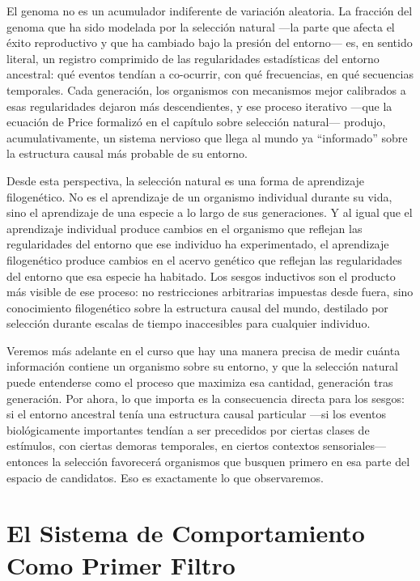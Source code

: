 \documentclass[
  letterpaper,
  DIV=11,
  numbers=noendperiod]{scrreprt}
\begin{document}
\begin{tcolorbox}[enhanced jigsaw, toprule=.15mm, arc=.35mm, colback=white, opacityback=0, colframe=quarto-callout-note-color-frame, breakable, rightrule=.15mm, left=2mm, leftrule=.75mm, bottomrule=.15mm]
El genoma no es un acumulador indiferente de variación aleatoria. La
fracción del genoma que ha sido modelada por la selección natural ---la
parte que afecta el éxito reproductivo y que ha cambiado bajo la presión
del entorno--- es, en sentido literal, un registro comprimido de las
regularidades estadísticas del entorno ancestral: qué eventos tendían a
co-ocurrir, con qué frecuencias, en qué secuencias temporales. Cada
generación, los organismos con mecanismos mejor calibrados a esas
regularidades dejaron más descendientes, y ese proceso iterativo ---que
la ecuación de Price formalizó en el capítulo sobre selección natural---
produjo, acumulativamente, un sistema nervioso que llega al mundo ya
``informado'' sobre la estructura causal más probable de su entorno.

Desde esta perspectiva, la selección natural es una forma de aprendizaje
filogenético. No es el aprendizaje de un organismo individual durante su
vida, sino el aprendizaje de una especie a lo largo de sus generaciones.
Y al igual que el aprendizaje individual produce cambios en el organismo
que reflejan las regularidades del entorno que ese individuo ha
experimentado, el aprendizaje filogenético produce cambios en el acervo
genético que reflejan las regularidades del entorno que esa especie ha
habitado. Los sesgos inductivos son el producto más visible de ese
proceso: no restricciones arbitrarias impuestas desde fuera, sino
conocimiento filogenético sobre la estructura causal del mundo,
destilado por selección durante escalas de tiempo inaccesibles para
cualquier individuo.

Veremos más adelante en el curso que hay una manera precisa de medir
cuánta información contiene un organismo sobre su entorno, y que la
selección natural puede entenderse como el proceso que maximiza esa
cantidad, generación tras generación. Por ahora, lo que importa es la
consecuencia directa para los sesgos: si el entorno ancestral tenía una
estructura causal particular ---si los eventos biológicamente
importantes tendían a ser precedidos por ciertas clases de estímulos,
con ciertas demoras temporales, en ciertos contextos sensoriales---
entonces la selección favorecerá organismos que busquen primero en esa
parte del espacio de candidatos. Eso es exactamente lo que observaremos.

\section{El Sistema de Comportamiento Como Primer
Filtro}\label{el-sistema-de-comportamiento-como-primer-filtro}


\end{tcolorbox}
\end{document}
